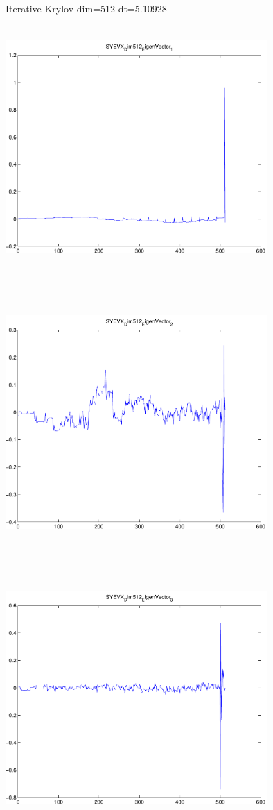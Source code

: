 \documentclass[9pt]{article}
\theoremstyle{plain}
\theoremstyle{definition}
\theoremstyle{remark}
\numberwithin{equation}{section}
\begin{document}
Iterative Krylov dim=512 dt=5.10928
\includegraphics[width=10.0cm,height=10.0cm]{SYEVX_Dim512_EigenVector_1.pdf}

\includegraphics[width=10.0cm,height=10.0cm]{SYEVX_Dim512_EigenVector_2.pdf}

\includegraphics[width=10.0cm,height=10.0cm]{SYEVX_Dim512_EigenVector_3.pdf}
\end{document}
